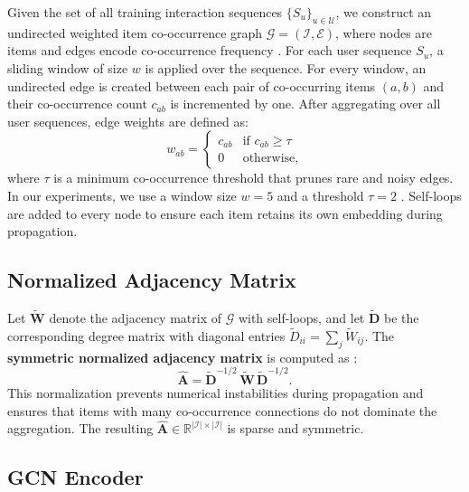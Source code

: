 \documentclass[12pt,a4paper]{report}
\newcommand{\parencite}[1]{\citep{#1}}
\begin{document}
Given the set of all training interaction sequences
$\{S_u\}_{u \in \mathcal{U}}$, we construct an undirected weighted
item co-occurrence graph $\mathcal{G} = (\mathcal{I}, \mathcal{E})$,
where nodes are items and edges encode co-occurrence frequency
\parencite{ouledmeriem2025hybrid}. For each user sequence $S_u$,
a sliding window of size $w$ is applied over the sequence. For
every window, an undirected edge is created between each pair of
co-occurring items $(a, b)$ and their co-occurrence count $c_{ab}$
is incremented by one. After aggregating over all user sequences,
edge weights are defined as:
\begin{equation}
  w_{ab} =
  \begin{cases}
    c_{ab} & \text{if } c_{ab} \geq \tau \\
    0      & \text{otherwise,}
  \end{cases}
\end{equation}
where $\tau$ is a minimum co-occurrence threshold that prunes
rare and noisy edges. In our experiments, we use a window size
$w = 5$ and a threshold $\tau = 2$
\parencite{ouledmeriem2025hybrid}. Self-loops are added to every
node to ensure each item retains its own embedding during
propagation.

\subsection{Normalized Adjacency Matrix}

Let $\tilde{\mathbf{W}}$ denote the adjacency matrix of
$\mathcal{G}$ with self-loops, and let $\tilde{\mathbf{D}}$ be
the corresponding degree matrix with diagonal entries
$\tilde{D}_{ii} = \sum_j \tilde{W}_{ij}$. The
\textbf{symmetric normalized adjacency matrix} is computed as
\parencite{kipf2017gcn}:
\begin{equation}
  \hat{\mathbf{A}} = \tilde{\mathbf{D}}^{-1/2}\,
                     \tilde{\mathbf{W}}\,
                     \tilde{\mathbf{D}}^{-1/2}.
\end{equation}
This normalization prevents numerical instabilities during
propagation and ensures that items with many co-occurrence
connections do not dominate the aggregation. The resulting
$\hat{\mathbf{A}} \in \mathbb{R}^{|\mathcal{I}| \times |\mathcal{I}|}$
is sparse and symmetric.

\subsection{GCN Encoder}
\end{document}
